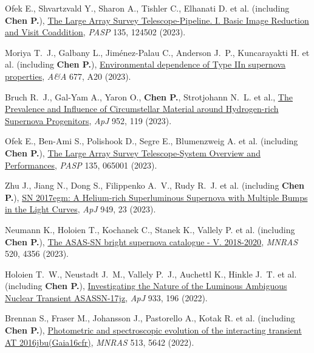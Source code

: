 \item Ofek E., Shvartzvald Y., Sharon A., Tishler C., Elhanati D. et al. (including \textbf{Chen P.}), \href{https://ui.adsabs.harvard.edu/abs/2023PASP..135l4502O}{The Large Array Survey Telescope-Pipeline. I. Basic Image Reduction and Visit Coaddition}, \textit{PASP} 135, 124502 (2023).

\item Moriya T.~J., Galbany L., Jim{\'e}nez-Palau C., Anderson J.~P., Kuncarayakti H. et al. (including \textbf{Chen P.}), \href{https://ui.adsabs.harvard.edu/abs/2023A&A...677A..20M}{Environmental dependence of Type IIn supernova properties}, \textit{A\&A} 677, A20 (2023).

\item Bruch R.~J., Gal-Yam A., Yaron O., \textbf{Chen P.}, Strotjohann N.~L. et al., \href{https://ui.adsabs.harvard.edu/abs/2023ApJ...952..119B}{The Prevalence and Influence of Circumstellar Material around Hydrogen-rich Supernova Progenitors}, \textit{ApJ} 952, 119 (2023).

\item Ofek E., Ben-Ami S., Polishook D., Segre E., Blumenzweig A. et al. (including \textbf{Chen P.}), \href{https://ui.adsabs.harvard.edu/abs/2023PASP..135f5001O}{The Large Array Survey Telescope-System Overview and Performances}, \textit{PASP} 135, 065001 (2023).

\item Zhu J., Jiang N., Dong S., Filippenko A.~V., Rudy R.~J. et al. (including \textbf{Chen P.}), \href{https://ui.adsabs.harvard.edu/abs/2023ApJ...949...23Z}{SN 2017egm: A Helium-rich Superluminous Supernova with Multiple Bumps in the Light Curves}, \textit{ApJ} 949, 23 (2023).

\item Neumann K., Holoien T., Kochanek C., Stanek K., Vallely P. et al. (including \textbf{Chen P.}), \href{https://ui.adsabs.harvard.edu/abs/2023MNRAS.520.4356N}{The ASAS-SN bright supernova catalogue - V. 2018-2020}, \textit{MNRAS} 520, 4356 (2023).

\item Holoien T.~W., Neustadt J.~M., Vallely P.~J., Auchettl K., Hinkle J.~T. et al. (including \textbf{Chen P.}), \href{https://ui.adsabs.harvard.edu/abs/2022ApJ...933..196H}{Investigating the Nature of the Luminous Ambiguous Nuclear Transient ASASSN-17jz}, \textit{ApJ} 933, 196 (2022).

\item Brennan S., Fraser M., Johansson J., Pastorello A., Kotak R. et al. (including \textbf{Chen P.}), \href{https://ui.adsabs.harvard.edu/abs/2022MNRAS.513.5642B}{Photometric and spectroscopic evolution of the interacting transient AT 2016jbu(Gaia16cfr)}, \textit{MNRAS} 513, 5642 (2022).

